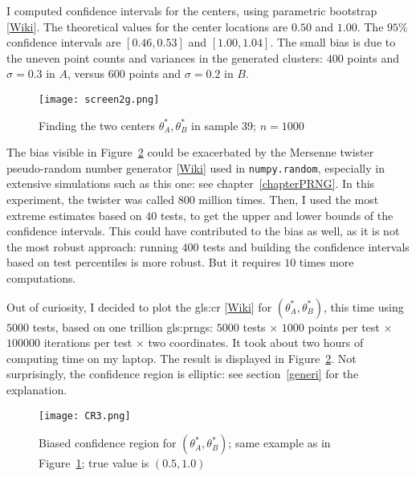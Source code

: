 \documentclass[oneside,10pt]{book}
\begin{document}
I computed confidence intervals for the centers, using \textcolor{index}{parametric bootstrap} [\href{https://en.wikipedia.org/wiki/Bootstrapping_(statistics)#Parametric_bootstrap}{Wiki}]. The theoretical values for the center
 locations are $0.50$ and $1.00$. The $95\%$ confidence intervals are $[0.46,0.53]$ and $[1.00, 1.04]$. The small bias is due to the uneven point counts and variances in the generated clusters: $400$ points and $\sigma=0.3$ in $A$, versus $600$ points and $\sigma=0.2$ in $B$. 

\begin{figure}%
\centering
\texttt{[image: screen2g.png]}   
\caption{Finding the two centers $\theta_A^*, \theta_B^*$ in sample 39; $n=1000$}
\label{fig:screen2}
\end{figure}

The bias visible in Figure~\ref{fig:cr} could be exacerbated by the
\textcolor{index}{Mersenne twister} pseudo-random number generator [\href{https://en.wikipedia.org/wiki/Mersenne_Twister}{Wiki}] used in \texttt{numpy.random}, especially in extensive simulations such as this one:
 see chapter~\ref{chapterPRNG}. In this experiment, the twister was called $800$ million times.  Then, I used the most extreme estimates based on $40$ tests, to get the upper and lower bounds of the confidence intervals. This could have contributed to the bias as well, as it is not the most robust approach: running $400$ tests and building the confidence intervals based on test percentiles is more robust. But it requires $10$ times more computations.

Out of curiosity, I decided to plot the \gls{gls:cr} [\href{https://en.wikipedia.org/wiki/Confidence_region}{Wiki}] for $(\theta_A^*,\theta_B^*)$, this time using $\num{5000}$ tests, 
 based on one trillion \glspl{gls:prng}: $\num{5000}$ tests $\times$ $1000$ points per test $\times$ $\num{100000}$ iterations per test $\times$ two 
 coordinates. It took about two hours of computing time on my laptop. The result is displayed in Figure~\ref{fig:cr}. Not surprisingly, the confidence
 region is elliptic: see section~\ref{generi} for the explanation.

\begin{figure}[H]
\centering
\texttt{[image: CR3.png]}  
\caption{Biased confidence region for $(\theta_A^*,\theta_B^*)$;  same example as in Figure~\ref{fig:screen2}; true value is $(0.5,1.0)$}
\label{fig:cr}
\end{figure}
\end{document}
